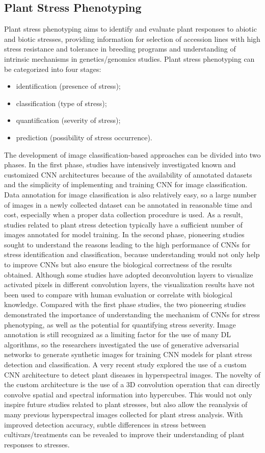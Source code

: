 \subsection{Plant Stress Phenotyping}
Plant stress phenotyping aims to identify and evaluate plant responses to abiotic and biotic stresses, providing information for selection of accession lines
with high stress resistance and tolerance in breeding programs and understanding of intrinsic mechanisms in genetics/genomics studies.
Plant stress phenotyping can be categorized into four stages:
\begin{itemize}
\item identification (presence of stress);
\item classification (type of stress); 
\item quantification (severity of stress);
\item prediction (possibility of stress occurrence).
\end{itemize}
The development of image classification-based approaches can be divided into two phases. In the first phase, studies have intensively investigated known
and customized CNN architectures because of the availability of annotated datasets and the simplicity of implementing and training CNN for image classification.
Data annotation for image classification is also relatively easy, so a large number of images in a newly collected dataset can be annotated in reasonable time and
cost, especially when a proper data collection procedure is used. As a result, studies related to plant stress detection typically have a sufficient number of
images annotated for model training. In the second phase, pioneering studies sought to understand the reasons leading to the high performance of CNNs for stress
identification and classification, because understanding would not only help to improve CNNs but also ensure the biological correctness of the results obtained.
Although some studies have adopted deconvolution layers to visualize activated pixels in different convolution layers, the visualization results have not been
used to compare with human evaluation or correlate with biological knowledge. Compared with the first phase studies, the two pioneering studies demonstrated the importance of
understanding the mechanism of CNNs for stress phenotyping, as well as the potential for quantifying stress severity. Image annotation is still recognized as a limiting factor
for the use of many DL algorithms, so the researchers investigated the use of generative adversarial networks to generate synthetic images for training CNN models for
plant stress detection and classification\cite{nazki2020unsupervised}. A very recent study explored the use of a custom CNN architecture to detect plant diseases in hyperspectral images.
The novelty of the custom architecture is the use of a 3D convolution operation that can directly convolve spatial and spectral information into hypercubes.
This would not only inspire future studies related to plant stresses, but also allow the reanalysis of many previous hyperspectral images collected for plant
stress analysis. With improved detection accuracy, subtle differences in stress between cultivars/treatments can be revealed to improve their understanding of plant
responses to stresses.

